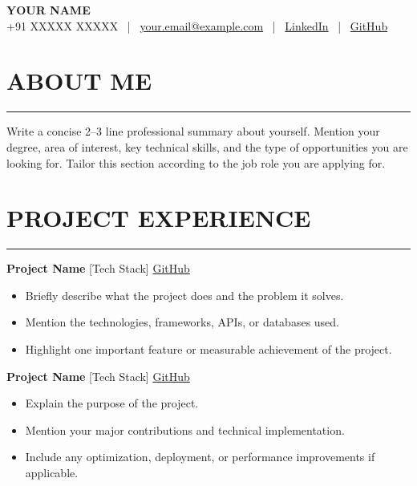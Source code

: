 \documentclass[a4paper,11pt]{article}
\newcommand{\ressection}[1]{\vspace{-2mm}\section*{\textbf{#1}}\vspace{-6mm}\noindent\rule{\textwidth}{0.1pt}}
\begin{document}

\begin{center}
    \textbf{\LARGE YOUR NAME}\\
    \vspace{2mm}
     +91 XXXXX XXXXX \, | \,
     \href{mailto:your.email@example.com}{your.email@example.com} \, | \,
     \href{https://linkedin.com/in/your-profile}{LinkedIn} \, | \,
     \href{https://github.com/yourusername}{GitHub}
\end{center}


\ressection{ABOUT ME}

Write a concise 2--3 line professional summary about yourself. Mention your degree, area of interest, key technical skills, and the type of opportunities you are looking for. Tailor this section according to the job role you are applying for.


\ressection{PROJECT EXPERIENCE}

\noindent
\textbf{Project Name} [Tech Stack]
\href{https://github.com/yourusername/project}{GitHub}

\vspace{-10pt}

\begin{itemize}[leftmargin=*]
\setlength{\itemsep}{2pt}

\item Briefly describe what the project does and the problem it solves.

\item Mention the technologies, frameworks, APIs, or databases used.

\item Highlight one important feature or measurable achievement of the project.

\end{itemize}

\vspace{-10pt}

\noindent
\textbf{Project Name} [Tech Stack]
\href{https://github.com/yourusername/project}{GitHub}

\vspace{-10pt}

\begin{itemize}[leftmargin=*]
\setlength{\itemsep}{2pt}

\item Explain the purpose of the project.

\item Mention your major contributions and technical implementation.

\item Include any optimization, deployment, or performance improvements if applicable.

\end{itemize}
\end{document}
